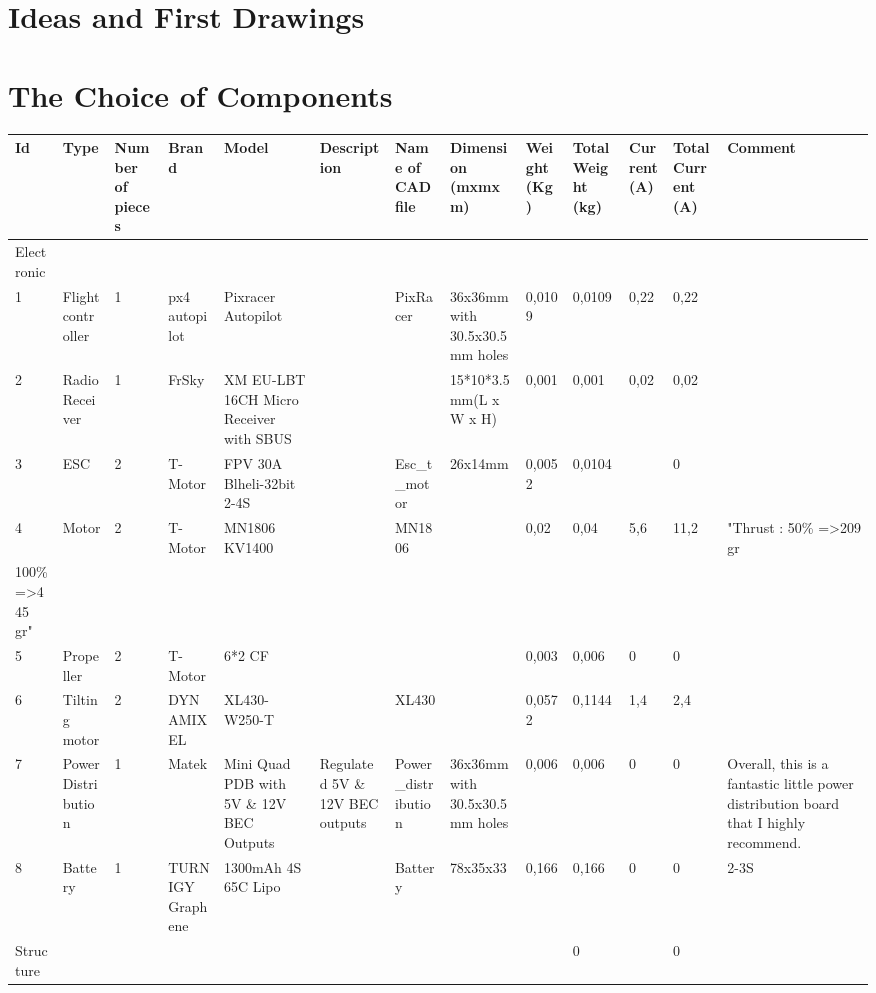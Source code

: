 \section{Ideas and First Drawings}


\section{The Choice of Components}

\begin{landscape}
\begin{table}[]
\centering
\begin{tabular}{llp{0.5cm}lp{3.0cm}llllllll}\toprule
Id & Type & Number of pieces & Brand & Model & Description & Name of CAD file & Dimension (mxmxm) & Weight (Kg) & Total Weight (kg) & Current (A) & Total Current (A) & Comment \\
\midrule
Electronic &  &  &  &  &  &  &  &  &  &  &  &  \\
\midrule
1 & Flight controller & 1 & px4 autopilot & Pixracer Autopilot &  & PixRacer & 36x36mm with 30.5x30.5mm holes & 0,0109 & 0,0109 & 0,22 & 0,22 &  \\
2 & Radio Receiver & 1 & FrSky & XM EU-LBT 16CH Micro Receiver with SBUS &  &  & 15*10*3.5mm(L x W x H) & 0,001 & 0,001 & 0,02 & 0,02 &  \\
3 & ESC & 2 & T-Motor & FPV 30A  Blheli-32bit 2-4S &  & Esc\_t\_motor & 26x14mm & 0,0052 & 0,0104 &  & 0 &  \\
4 & Motor & 2 & T-Motor & MN1806 KV1400 &  & MN1806 &  & 0,02 & 0,04 & 5,6 & 11,2 & "Thrust : 50\% =\textgreater 209 gr \\
100\% =\textgreater 445 gr" &  &  &  &  &  &  &  &  &  &  &  &  \\
5 & Propeller & 2 & T-Motor & 6*2 CF &  &  &  & 0,003 & 0,006 & 0 & 0 &  \\
6 & Tilting motor & 2 & DYNAMIXEL & XL430-W250-T &  & XL430 &  & 0,0572 & 0,1144 & 1,4 & 2,4 &  \\
7 & Power Distribution & 1 & Matek & Mini Quad PDB with 5V \& 12V BEC Outputs & Regulated 5V \& 12V BEC outputs & Power\_distribution & 36x36mm with 30.5x30.5mm holes & 0,006 & 0,006 & 0 & 0 & Overall, this is a fantastic little power distribution board that I highly recommend. \\
8 & Battery & 1 & TURNIGY Graphene & 1300mAh 4S 65C Lipo &  & Battery & 78x35x33 & 0,166 & 0,166 & 0 & 0 & 2-3S \\
\midrule
Structure &  &  &  &  &  &  &  &  & 0 &  & 0 &  \\

\end{tabular}
\end{table}
\end{landscape}
